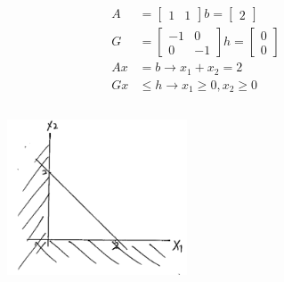 \begin{example}
	\begin{align*}A &= 
		\begin{bmatrix}
			1 & 1
		\end{bmatrix}
		b = 
		\begin{bmatrix}
			2
		\end{bmatrix}\\
		G &= 
		\begin{bmatrix}
			-1 & 0\\
			0 & -1
		\end{bmatrix}
		h = 
		\begin{bmatrix}
			0\\
			0
		\end{bmatrix}\\
		Ax &= b \rightarrow x_1 + x_2 = 2\\
		Gx &\leq h \rightarrow x_1 \geq 0, x_2\geq 0
	\end{align*}
	
	
	\begin{figure}
		\centering
		\includegraphics[width=2.1in,height=2.1in]{figures/ch07/figure1012_2.png}
	\end{figure}
\end{example}









